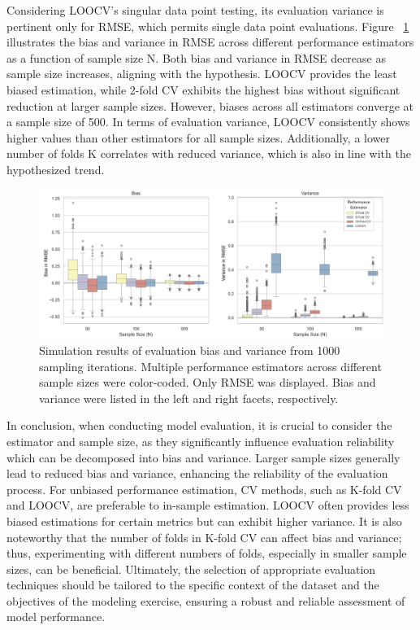Considering LOOCV’s singular data point testing, its evaluation variance is pertinent only for RMSE, which permits single data point evaluations. Figure ~\ref{fig:s1_var} illustrates the bias and variance in RMSE across different performance estimators as a function of sample size N. Both bias and variance in RMSE decrease as sample size increases, aligning with the hypothesis. LOOCV provides the least biased estimation, while 2-fold CV exhibits the highest bias without significant reduction at larger sample sizes. However, biases across all estimators converge at a sample size of 500. In terms of evaluation variance, LOOCV consistently shows higher values than other estimators for all sample sizes. Additionally, a lower number of folds K correlates with reduced variance, which is also in line with the hypothesized trend.

\begin{figure}[H]
    \centering
    \includegraphics[width=1\textwidth]{fig_s1_var.jpg}
    \caption{Simulation results of evaluation bias and variance from 1000 sampling iterations. Multiple performance estimators across different sample sizes were color-coded. Only RMSE was displayed. Bias and variance were listed in the left and right facets, respectively.}
    \label{fig:s1_var}
\end{figure}

In conclusion, when conducting model evaluation, it is crucial to consider the estimator and sample size, as they significantly influence evaluation reliability which can be decomposed into bias and variance. Larger sample sizes generally lead to reduced bias and variance, enhancing the reliability of the evaluation process. For unbiased performance estimation, CV methods, such as K-fold CV and LOOCV, are preferable to in-sample estimation. LOOCV often provides less biased estimations for certain metrics but can exhibit higher variance. It is also noteworthy that the number of folds in K-fold CV can affect bias and variance; thus, experimenting with different numbers of folds, especially in smaller sample sizes, can be beneficial. Ultimately, the selection of appropriate evaluation techniques should be tailored to the specific context of the dataset and the objectives of the modeling exercise, ensuring a robust and reliable assessment of model performance.

